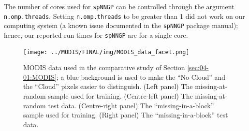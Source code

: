 \documentclass[12pt,a4paper]{article}
\begin{document}
The number of cores used for \texttt{spNNGP} can be controlled through the argument \texttt{n.omp.threads}. 
Setting \texttt{n.omp.threads} to be greater than 1 did not work on our computing system (a known issue documented in the \texttt{spNNGP} package manual); hence, our reported run-times for \texttt{spNNGP} are for a single core.

\begin{figure}[t!]
    \centering
    \texttt{[image: ../MODIS/FINAL/img/MODIS\_data\_facet.png]}
     \caption{
     MODIS data used in the comparative study of Section \ref{sec:04-01:MODIS}; a blue background is used to make the ``No Cloud'' and the ``Cloud'' pixels easier to distinguish. (Left panel) The missing-at-random sample used for training.  (Centre-left panel) The missing-at-random test data. (Centre-right panel) The ``missing-in-a-block'' sample used for training. (Right panel) The ``missing-in-a-block'' test data. 
     }\label{fig:03-04-Modis1}
\end{figure}
\end{document}
